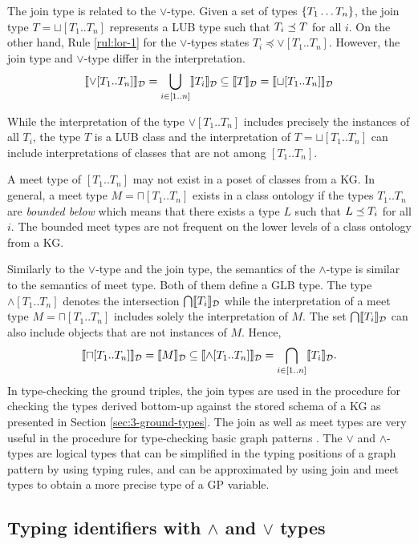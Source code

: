 \documentclass[runningheads]{llncs}
\newcommand{\llb}{\llbracket}
\newcommand{\rrb}{\rrbracket}
\begin{document}
The join type is related to the $\lor$-type. Given a set of types
$\{T_1\ldots\/T_n\}$, the join type $T=\sqcup[T_1..T_n]$ represents a
LUB type such that $T_i\preceq\/T$ for all $i$. On the other hand,
Rule \ref{rul:lor-1} for the $\lor$-types states
$T_i\preceq\lor[T_1..T_n]$. However, the join type and $\lor$-type
differ in the interpretation. 
$$\llb\lor[T_1..T_n]\rrb_\D=\bigcup_{i\in[1..n]}\rrb\/T_i\rrb_\D\subseteq\llb\/T\rrb_\D=\llb\sqcup[T_1..T_n]\rrb_\D$$

While the interpretation of the type $\lor[T_1..T_n]$ includes
precisely the instances of all $T_i$, the type $T$ is a LUB class and
the interpretation of $T=\sqcup[T_1..T_n]$ can include interpretations
of classes that are not among $[T_1..T_n]$.

A meet type of $[T_1..T_n]$ may not exist in a poset of classes from a
KG. In general, a meet type $M=\sqcap[T_1..T_n]$ exists in a class
ontology if the types $T_1..T_n$ are \emph{bounded below} which means
that there exists a type $L$ such that $L\preceq\/T_i$ for all
$i$. The bounded meet types \cite{Pierce2002} are not frequent on the
lower levels of a class ontology from a KG.

Similarly to the $\lor$-type and the join type, the semantics of the
$\land$-type is similar to the semantics of meet type. Both of them
define a GLB type. The type $\land[T_1..T_n]$ denotes the intersection
$\bigcap\/\llb\/T_i\rrb_\D$ while the interpretation of a meet type
$M=\sqcap[T_1..T_n]$ includes solely the interpretation of $M$. The
set $\bigcap\/\llb\/T_i\rrb_\D$ can also include objects that are not
instances of $M$. Hence,
$$\llb\sqcap[T_1..T_n]\rrb_\D=\llb\/M\rrb_\D\subseteq\llb\land[T_1..T_n]\rrb_\D=\bigcap_{i\in[1..n]}\/\llb\/T_i\rrb_\D.$$
In type-checking the ground triples, the join types are used in the
procedure for checking the types derived bottom-up against the stored
schema of a KG as presented in Section \ref{sec:3-ground-types}. The
join as well as meet types are very useful in the procedure for
type-checking basic graph patterns \cite{Savnik2025a}. The $\lor$ and
$\land$-types are logical types that can be simplified in the typing
positions of a graph pattern by using typing rules, and can be
approximated by using join and meet types to obtain a more precise
type of a GP variable.




\subsection{Typing identifiers with $\land$ and $\lor$ types}
\end{document}
